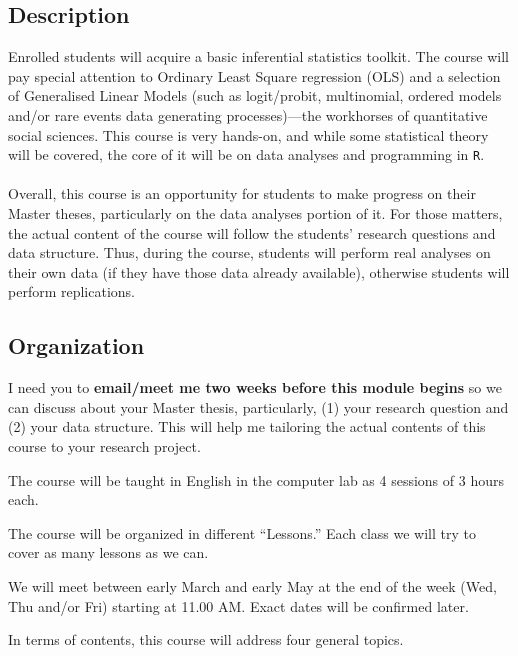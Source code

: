 \documentclass[letterpaper]{article}
\renewenvironment{itemize}{
  \begin{list}{}{
    \setlength{\leftmargin}{1.5em}
  }
}{
  \end{list}
}
\begin{document}
\subsection*{Description}

Enrolled students will acquire a basic inferential statistics toolkit. The course will pay special attention to Ordinary Least Square regression (OLS) and a selection of Generalised Linear Models (such as logit/probit, multinomial, ordered models and/or rare events data generating processes)---the workhorses of quantitative social sciences. This course is very hands-on, and while some statistical theory will be covered, the core of it will be on data analyses and programming in \texttt{R}. 
\\
\\
Overall, this course is an opportunity for students to make progress on their Master theses, particularly on the data analyses portion of it. For those matters, the actual content of the course will follow the students' research questions and data structure. Thus, during the course, students will perform real analyses on their own data (if they have those data already available), otherwise students will perform replications. 


\subsection*{Organization}

\begin{itemize}
  \item[{\color{red}\Pointinghand}] I need you to {\bf email/meet me two weeks before this module begins} so we can discuss about your Master thesis, particularly, (1) your research question and (2) your data structure. This will help me tailoring the actual contents of this course to your research project.
  \item[$\circ$] The course will be taught in English in the computer lab as 4 sessions of 3 hours each.
  \item[$\circ$] The course will be organized in different ``Lessons.'' Each class we will try to cover as many lessons as we can.
  \item[$\circ$] We will meet between early March and early May at the end of the week (Wed, Thu and/or Fri) starting at 11.00 AM. Exact dates will be confirmed later.
\end{itemize}

In terms of contents, this course will address four general topics.
\end{document}
